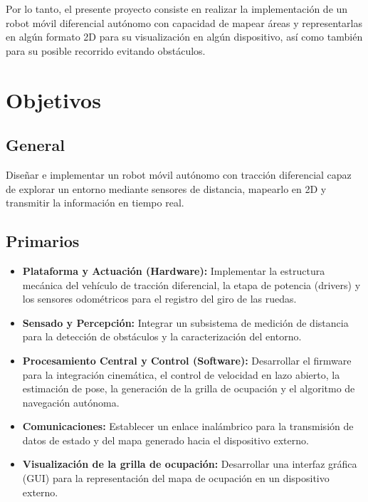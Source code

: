 Por lo tanto, el presente proyecto consiste en realizar la implementación de un robot móvil diferencial autónomo con capacidad de mapear áreas y representarlas en algún formato 2D para su visualización en algún dispositivo, así como también para su posible recorrido evitando obstáculos.

\newpage

\section{Objetivos}

\subsection{General}
Diseñar e implementar un robot móvil autónomo con tracción diferencial capaz de explorar un entorno mediante sensores de distancia, mapearlo en 2D y transmitir la información en tiempo real.

\subsection{Primarios}
\begin{itemize}
    \item \textbf{Plataforma y Actuación (Hardware):} Implementar la estructura mecánica del vehículo de tracción diferencial, la etapa de potencia (drivers) y los sensores odométricos para el registro del giro de las ruedas.
    \item \textbf{Sensado y Percepción:} Integrar un subsistema de medición de distancia para la detección de obstáculos y la caracterización del entorno.
    \item \textbf{Procesamiento Central y Control (Software):} Desarrollar el firmware para la integración cinemática, el control de velocidad en lazo abierto, la estimación de pose, la generación de la grilla de ocupación y el algoritmo de navegación autónoma.
    \item \textbf{Comunicaciones:} Establecer un enlace inalámbrico para la transmisión de datos de estado y del mapa generado hacia el dispositivo externo.
    \item \textbf{Visualización de la grilla de ocupación:} Desarrollar una interfaz gráfica (GUI) para la representación del mapa de ocupación en un dispositivo externo.
\end{itemize}

